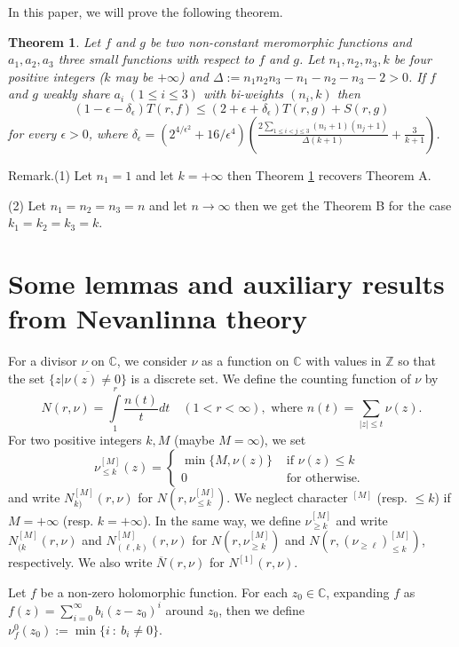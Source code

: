 \documentclass[12pt,leqno]{amsart}
\newtheorem{theorem}[equation]{Theorem}
\newcommand{\C}{{\mathbb{C}}}
\newcommand{\Z}{\mathbb{Z}}
\numberwithin{equation}{section}
\begin{document}
In this paper, we will prove the following theorem.

\begin{theorem}\label{1.1}
    \textit{Let $f$ and $g$ be two non-constant meromorphic functions and $a_1,a_2,a_3$ three small functions with respect to $f$ and $g$. Let $n_1,n_2,n_3,k$ be four positive integers ($k$ may be $+\infty$) and $\Delta :=n_1n_2n_3-n_1-n_2-n_3-2>0$. If $f$ and $g$ weakly share $a_i\ (1\le i\le 3)$ with bi-weights $(n_i,k)$ then
$$(1-\epsilon-\delta_\epsilon)T(r, f)\le (2+\epsilon +\delta_\epsilon )T(r, g)+S(r, g)$$
for every $\epsilon>0$, where $\displaystyle\delta_\epsilon=(2^{4/\epsilon^2}+16/\epsilon^4)\left(\frac{2\sum_{1\le i<j\le 3}(n_i+1)(n_j+1)}{\Delta(k+1)}+\frac{3}{k+1}\right)$.}
\end{theorem}

Remark.(1) Let $n_1=1$ and let $k=+\infty$ then Theorem \ref{1.1} recovers Theorem A.

(2) Let $n_1=n_2=n_3=n$ and let $n\longrightarrow\infty$ then we get the Theorem B for the case $k_1=k_2=k_3=k$.

\section{Some lemmas and auxiliary results from Nevanlinna theory}

For a divisor $\nu$ on $\C$, we consider $\nu$ as a function on $\C$ with values in $\Z$ so that the set $\overline{\{z|\nu(z)\ne 0\}}$ is a discrete set. We define the counting function of $\nu$ by
$$N(r,\nu)=\int\limits_1^r \dfrac {n(t)}{t}dt \quad (1<r<\infty), \text{ where } n(t)=\sum\limits_{|z|\leq t}\nu (z).$$
For two positive integers $k,M$ (maybe $M= \infty$), we set 
$$ \nu^{[M]}_{\leq k} (z)=
\begin{cases}
\min\{M,\nu (z)\}&\text{ if }\nu (z)\leq k\\
0&\text{ for otherwise. }
\end{cases}$$
and write $N^{[M]}_{k)}(r,\nu)$ for $N(r,\nu^{[M]}_{\leq k})$. We neglect character $^{[M]}$ (resp. $\leq k$) if $M=+\infty$ (resp. $k=+\infty$). In the same way, we define $\nu^{[M]}_{\ge k}$ and write $N^{[M]}_{(k}(r,\nu)$ and $N^{[M]}_{(\ell,k)}(r,\nu)$ for $N(r,\nu^{[M]}_{\ge k})$ and $N(r,(\nu_{\ge\ell})_{\le k}^{[M]})$, respectively. We also write $\overline N(r,\nu)$ for $N^{[1]}(r,\nu)$.

Let $f$ be a non-zero holomorphic function. For each $z_0\in\C$, expanding $f$ as
$ f(z) =\sum_{i=0}^\infty b_i(z-z_0)^i$ around $z_0$, then we define $\nu^{0}_{f}(z_0):=\min\{i\ :\ b_i \ne 0\}$. 
\end{document}
